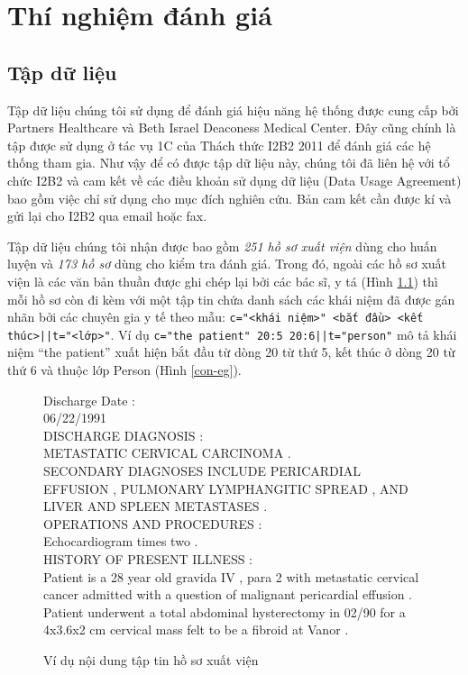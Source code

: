 \chapter{Thí nghiệm đánh giá}
\section{Tập dữ liệu}
Tập dữ liệu chúng tôi sử dụng để đánh giá hiệu năng hệ thống được cung cấp bởi Partners Healthcare và Beth Israel Deaconess Medical Center. Đây cũng chính là tập được sử dụng ở tác vụ 1C của Thách thức I2B2 2011 để đánh giá các hệ thống tham gia. Như vậy để có được tập dữ liệu này, chúng tôi đã liên hệ với tổ chức I2B2 và cam kết về các điều khoản sử dụng dữ liệu (Data Usage Agreement) bao gồm việc chỉ sử dụng cho mục đích nghiên cứu. Bản cam kết cần được kí và gửi lại cho I2B2 qua email hoặc fax.

Tập dữ liệu chúng tôi nhận được bao gồm \emph{251 hồ sơ xuất viện} dùng cho huấn luyện và \emph{173 hồ sơ} dùng cho kiểm tra đánh giá. Trong đó, ngoài các hồ sơ xuất viện là các văn bản thuần được ghi chép lại bởi các bác sĩ, y tá (Hình \ref{hsxv-eg}) thì mỗi hồ sơ còn đi kèm với một tập tin chứa danh sách các khái niệm đã được gán nhãn bởi các chuyên gia y tế theo mẫu: \texttt{c="<khái niệm>" <bắt đầu> <kết thúc>||t="<lớp>"}. Ví dụ \texttt{c="the patient" 20:5 20:6||t="person"} mô tả khái niệm ``the patient'' xuất hiện bắt đầu từ dòng 20 từ thứ 5, kết thúc ở dòng 20 từ thứ 6 và thuộc lớp Person (Hình \ref{con-eg}).

\begin{figure}[ht]
\begin{mdframed}
\ttfamily\footnotesize
\protect\raggedright
Discharge Date :\\
06/22/1991\\
DISCHARGE DIAGNOSIS :\\
METASTATIC CERVICAL CARCINOMA .\\
SECONDARY DIAGNOSES INCLUDE PERICARDIAL EFFUSION , PULMONARY LYMPHANGITIC SPREAD , AND LIVER AND SPLEEN METASTASES .\\
OPERATIONS AND PROCEDURES :\\
Echocardiogram times two .\\
HISTORY OF PRESENT ILLNESS :\\
Patient is a 28 year old gravida IV , para 2 with metastatic cervical cancer admitted with a question of malignant pericardial effusion .\\
Patient underwent a total abdominal hysterectomy in 02/90 for a 4x3.6x2 cm cervical mass felt to be a fibroid at Vanor .
\end{mdframed}
\caption{Ví dụ nội dung tập tin hồ sơ xuất viện\label{hsxv-eg}}
\end{figure}


